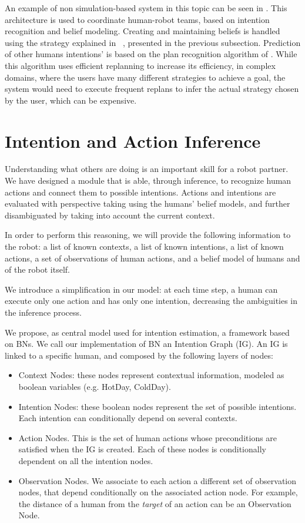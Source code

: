 An example of non simulation-based system in this topic can be seen in \cite{talamadupula2014coordination}. This architecture is used to coordinate human-robot teams, based on intention recognition and belief modeling. Creating and maintaining beliefs is handled using the strategy explained in ~\cite{scheutz2013computational}, presented in the previous subsection. Prediction of other humans intentions' is based on the plan recognition algorithm of \cite{ramirez2009plan}. While this algorithm uses efficient replanning to increase its efficiency, in complex domains, where the users have many different strategies to achieve a goal, the system would need to execute frequent replans to infer the actual strategy chosen by the user, which can be expensive.


\section{Intention and Action Inference}
\label{sec:situation_assessment-intention_recognition}
Understanding what others are doing is an important skill for a robot partner. We have designed a module that is able, through inference, to recognize human actions and connect them to possible intentions. Actions and intentions are evaluated with perspective taking using the humans' belief models, and further disambiguated by taking into account the current context.

In order to perform this reasoning, we will provide the following information to the robot: a list of known contexts, a list of known intentions, a list of known actions, a set of observations of human actions, and a belief model of humans and of the robot itself.

We introduce a simplification in our model: at each time step, a human can execute only one action and has only one intention, decreasing the ambiguities in the inference process.

We propose, as central model used for intention estimation, a framework based on BNs. We call our implementation of BN an Intention Graph (IG).
An IG is linked to a specific human, and composed by the following layers of nodes:
\begin{itemize}
\item Context Nodes: these nodes represent contextual information, modeled as boolean variables (e.g. HotDay, ColdDay).
\item Intention Nodes: these boolean nodes represent the set of possible intentions. Each intention can conditionally depend on several contexts.
\item Action Nodes. This is the set of human actions whose preconditions are satisfied when the IG is created. Each of these nodes is conditionally dependent on all the intention nodes. 
\item Observation Nodes. We associate to each action a different set of observation nodes, that depend conditionally on the associated action node. For example, the distance of a human from the \textit{target} of an action can be an Observation Node.
\end{itemize}

